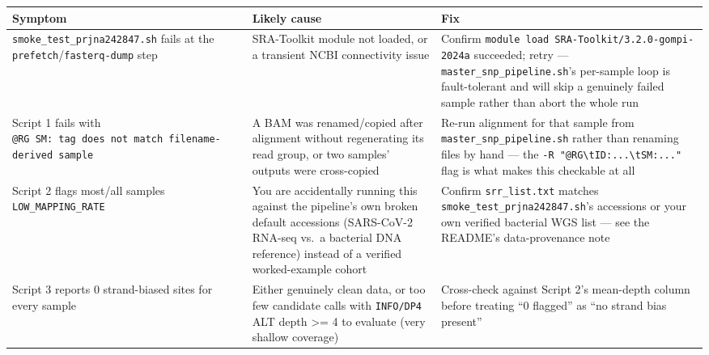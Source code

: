 \documentclass[
]{article}
\newcounter{none} %
\begin{document}
{\def\LTcaptype{none} %
\begin{longtable}[]{@{}
  >{\raggedright\arraybackslash}p{}
  >{\raggedright\arraybackslash}p{}
  >{\raggedright\arraybackslash}p{}@{}}
\toprule\noalign{}
\begin{minipage}[b]{\linewidth}\raggedright
Symptom
\end{minipage} & \begin{minipage}[b]{\linewidth}\raggedright
Likely cause
\end{minipage} & \begin{minipage}[b]{\linewidth}\raggedright
Fix
\end{minipage} \\
\midrule\noalign{}
\endhead
\bottomrule\noalign{}
\endlastfoot
\texttt{smoke\_test\_prjna242847.sh} fails at the
\texttt{prefetch}/\texttt{fasterq-dump} step & SRA-Toolkit module not
loaded, or a transient NCBI connectivity issue & Confirm
\texttt{module\ load\ SRA-Toolkit/3.2.0-gompi-2024a} succeeded; retry
--- \texttt{master\_snp\_pipeline.sh}'s per-sample loop is
fault-tolerant and will skip a genuinely failed sample rather than abort
the whole run \\
Script 1 fails with
\texttt{@RG\ SM:\ tag\ does\ not\ match\ filename-derived\ sample} & A
BAM was renamed/copied after alignment without regenerating its read
group, or two samples' outputs were cross-copied & Re-run alignment for
that sample from \texttt{master\_snp\_pipeline.sh} rather than renaming
files by hand --- the
\texttt{-R\ "@RG\textbackslash{}tID:...\textbackslash{}tSM:..."} flag is
what makes this checkable at all \\
Script 2 flags most/all samples \texttt{LOW\_MAPPING\_RATE} & You are
accidentally running this against the pipeline's own broken default
accessions (SARS-CoV-2 RNA-seq vs.~a bacterial DNA reference) instead of
a verified worked-example cohort & Confirm \texttt{srr\_list.txt}
matches \texttt{smoke\_test\_prjna242847.sh}'s accessions or your own
verified bacterial WGS list --- see the README's data-provenance note \\
Script 3 reports 0 strand-biased sites for every sample & Either
genuinely clean data, or too few candidate calls with \texttt{INFO/DP4}
ALT depth \textgreater= 4 to evaluate (very shallow coverage) &
Cross-check against Script 2's mean-depth column before treating ``0
flagged'' as ``no strand bias present'' \\

\end{longtable}}
\end{document}
